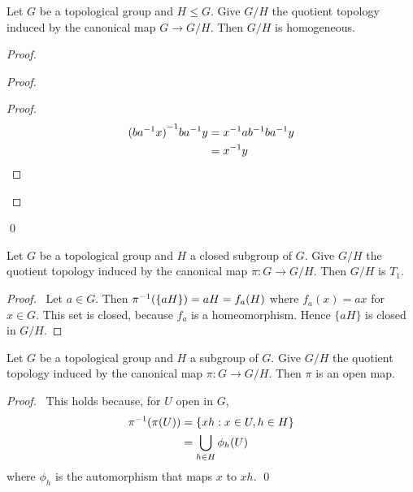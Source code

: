 \begin{prop}
  Let $G$ be a topological group and $H \leq G$. Give $G/H$ the quotient topology induced by the canonical map $G \rightarrow G / H$. Then $G / H$ is homogeneous.
\end{prop}

\begin{proof}
  \pf
  \begin{proof}
    \begin{proof}
      \pf\
      \begin{align*}
        {(b \ensuremath{{a}^{-1}} x)}^{-1} b {a}^{-1} y & = {x}^{-1} a {b}^{-1} b {a}^{-1} y \\
        & = {x}^{-1} y
      \end{align*}
    \end{proof}
  \end{proof}
  \qed
\end{proof}

\begin{prop}
  \label{prop:group:quotient_T1}
  Let $G$ be a topological group and $H$ a closed subgroup of $G$. Give $G/H$ the quotient topology induced by the canonical map $\pi : G \rightarrow G / H$. Then $G / H$ is $T_1$.
\end{prop}

\begin{proof}
  \pf\ Let $a \in G$. Then ${\pi}^{-1}(\{aH\}) = aH = f_a(H)$ where $f_a(x) = ax$ for $x \in G$. This set is closed, because $f_a$ is a homeomorphism. Hence $\{ aH \}$ is closed in $G / H$.
\end{proof}

\begin{prop}
  \label{prop:group:quotient_open}
  Let $G$ be a topological group and $H$ a subgroup of $G$. Give $G / H$ the quotient topology induced by the canonical map $\pi : G \rightarrow G / H$. Then $\pi$ is an open map.
\end{prop}

\begin{proof}
  \pf\ This holds because, for $U$ open in $G$,
  \begin{align*}
    {\pi}^{-1}(\pi(U)) & = \{ xh : x \in U, h \in H \} \\
    & = \bigcup_{h \in H} \phi_h(U)
  \end{align*}
  where $\phi_h$ is the automorphism that maps $x$ to $xh$. \qed
\end{proof}

